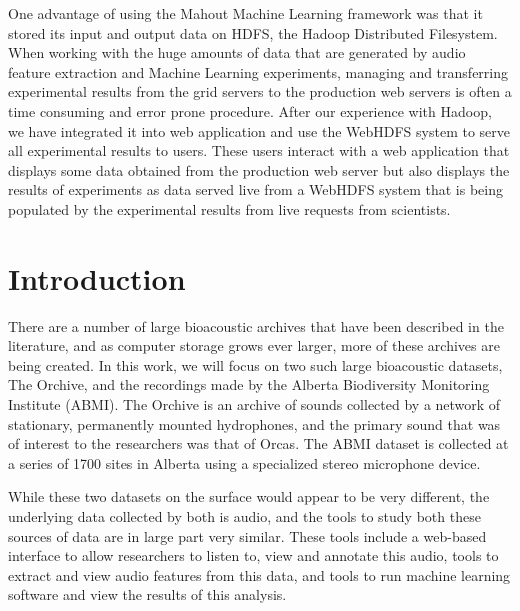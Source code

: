 \documentclass[12pt,oneside]{book}
\begin{document}
One advantage of using the Mahout Machine Learning framework was that
it stored its input and output data on HDFS, the Hadoop Distributed
Filesystem.  When working with the huge amounts of data that are
generated by audio feature extraction and Machine Learning
experiments, managing and transferring experimental results from the
grid servers to the production web servers is often a time consuming
and error prone procedure.  After our experience with Hadoop, we have
integrated it into web application and use the WebHDFS system to serve
all experimental results to users.  These users interact with a web
application that displays some data obtained from the production web
server but also displays the results of experiments as data served
live from a WebHDFS system that is being populated by the experimental
results from live requests from scientists.




\label{chapter:caseStudies}


\section{Introduction}\label{sec:introduction}

There are a number of large bioacoustic archives that have been
described in the literature, and as computer storage grows ever
larger, more of these archives are being created.  In this work, we
will focus on two such large bioacoustic datasets, The Orchive, and
the recordings made by the Alberta Biodiversity Monitoring Institute
(ABMI).  The Orchive is an archive of sounds collected by a network of
stationary, permanently mounted hydrophones, and the primary sound
that was of interest to the researchers was that of Orcas.  The ABMI
dataset is collected at a series of 1700 sites in Alberta using
a specialized stereo microphone device.

While these two datasets on the surface would appear to be very
different, the underlying data collected by both is audio, and the
tools to study both these sources of data are in large part very
similar.  These tools include a web-based interface to allow
researchers to listen to, view and annotate this audio, tools to
extract and view audio features from this data, and tools to run
machine learning software and view the results of this analysis.
\end{document}
